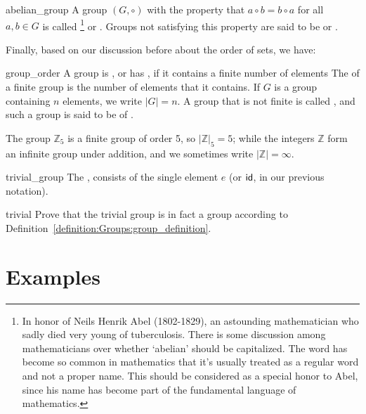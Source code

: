 \begin{defn}{abelian_group} 
A group $(G,\circ)$ with the property that $a \circ b = b \circ a$ for all $a, b \in G$ is called \footnote{In honor of Neils Henrik Abel (1802-1829), an astounding mathematician who sadly died very young of tuberculosis. There is some discussion among mathematicians over whether `abelian' should be capitalized. The word has become so common in mathematics that it's usually treated as a regular word and not a proper name. This should be considered as a special honor to Abel, since his name has become part of the fundamental language of mathematics.}  or .  Groups not satisfying this property are said to be   or . 
\end{defn}

Finally, based on our discussion before about the order of sets, we have:

\begin{defn}{group_order}
A group is , or has , if it contains a finite number of elements The 
of a finite group is the number of elements that it contains. If $G$
is a group containing $n$ elements, we write $|G| =
n$. A group that is not finite is called , and such a group is said to be of .
\end{defn} 

The group ${\mathbb Z}_5$ is a finite group of order
5, so $|{\mathbb Z}|_5=5$; while the integers ${\mathbb Z}$ form an infinite group under addition, and
we sometimes write $|{\mathbb Z}| = \infty$.

\begin{defn}{trivial_group}
The , consists of the single element $e$  (or ${\sf{i}d}$, in our previous notation).
\end{defn} 

\begin{exercise}{trivial}
Prove that the trivial group is in fact a group according to Definition~\ref{definition:Groups:group_definition}.
\end{exercise}

\section{Examples}
\label{sec:Groups:Examples}

